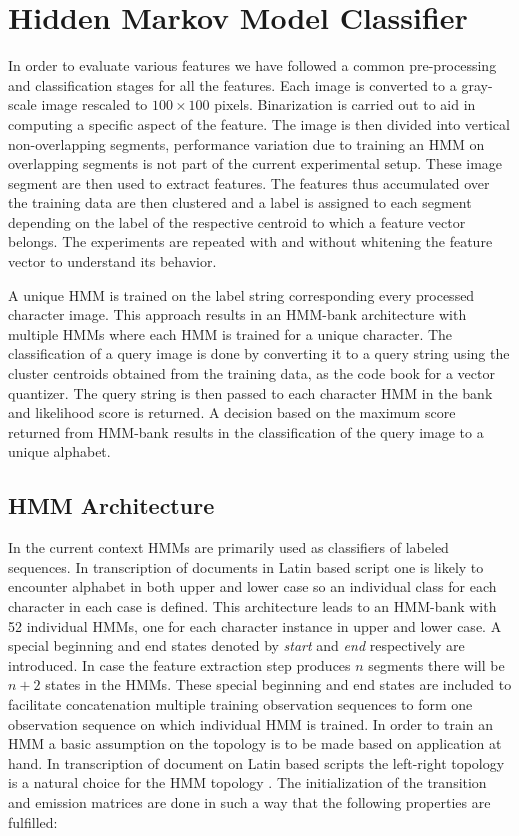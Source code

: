 \documentclass[runningheads]{llncs}
\begin{document}
\section{Hidden Markov Model Classifier}
\label{sec:HMM}
In order to evaluate various features we have followed a common pre-processing and classification stages for all the features. Each image is converted to a gray-scale image rescaled to $100 \times 100$ pixels. Binarization is carried out to aid in computing a specific aspect of the feature. The image is then divided into vertical non-overlapping segments, performance variation due to training an HMM on overlapping segments is not part of the current experimental setup. These image segment are then used to extract features. The features thus accumulated over the training data are then clustered and a label is assigned to each segment depending on the label of the respective centroid to which a feature vector belongs. The experiments are repeated with and without whitening the feature vector to understand its behavior.

A unique HMM is trained on the label string corresponding every processed character image. This approach results in an HMM-bank architecture with multiple HMMs where each HMM is trained for a unique character. The classification of a query image is done by converting it to a query string using the cluster centroids obtained from the training data, as the code book for a vector quantizer. The query string is then passed to each character HMM in the bank and likelihood score is returned. A decision based on the maximum score returned from HMM-bank results in the classification of the query image to a unique alphabet.\\

\subsection{HMM Architecture}
\label{ssec:archi}
In the current context HMMs are primarily used as classifiers of labeled sequences. In transcription of documents in Latin based script one is likely to encounter alphabet in both upper and lower case so an individual class for each character in each case is defined. This architecture leads to an HMM-bank with 52 individual HMMs, one for each character instance in upper and lower case. A special beginning and end states denoted by \textit{start} and \textit{end} respectively are introduced. In case the feature extraction step produces $n$ segments there will be $n + 2$ states in the HMMs. These special beginning and end states are included to facilitate concatenation multiple training observation sequences to form one observation sequence on which individual HMM is trained. In order to train an HMM a basic assumption on the topology is to be made based on application at hand. In transcription of document on Latin based scripts the left-right topology is a natural choice for the HMM topology \cite{Laan}. The initialization of the transition and emission matrices are done in such a way that the following properties are fulfilled:
\end{document}
